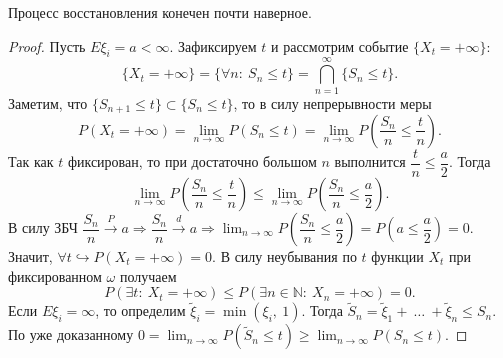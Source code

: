 \begin{example}
\begin{tikzpicture}[x=0.75pt,y=0.75pt,yscale=-1,xscale=1]
\end{tikzpicture}

\end{example}
\begin{proposition}
Процесс восстановления конечен почти наверное.
\end{proposition}
\begin{proof}
Пусть $\displaystyle E\xi _{i} =a< \infty $. Зафиксируем $\displaystyle t$ и рассмотрим событие $\displaystyle \{X_{t} =+\infty \}$:
\begin{equation*}
\{X_{t} =+\infty \} =\{\forall n:\ S_{n} \leqslant t\} =\bigcap _{n=1}^{\infty }\{S_{n} \leqslant t\} .
\end{equation*}
Заметим, что $\displaystyle \{S_{n+1} \leqslant t\} \subset \{S_{n} \leqslant t\}$, то в силу непрерывности меры
\begin{equation*}
P( X_{t} =+\infty ) =\lim _{n\rightarrow \infty } P( S_{n} \leqslant t) =\lim _{n\rightarrow \infty } P\left(\dfrac{S_{n}}{n} \leqslant \dfrac{t}{n}\right) .
\end{equation*}
Так как $\displaystyle t$ фиксирован, то при достаточно большом $\displaystyle n$ выполнится $\displaystyle \dfrac{t}{n} \leqslant \dfrac{a}{2}$. Тогда
\begin{equation*}
\lim _{n\rightarrow \infty } P\left(\dfrac{S_{n}}{n} \leqslant \dfrac{t}{n}\right) \leqslant \lim _{n\rightarrow \infty } P\left(\dfrac{S_{n}}{n} \leqslant \dfrac{a}{2}\right) .
\end{equation*}
В силу ЗБЧ $\displaystyle \dfrac{S_{n}}{n}\xrightarrow{P} a\Rightarrow \dfrac{S_{n}}{n}\xrightarrow{d} a\Rightarrow \lim _{n\rightarrow \infty } P\left(\dfrac{S_{n}}{n} \leqslant \dfrac{a}{2}\right) =P\left( a\leqslant \dfrac{a}{2}\right) =0$. Значит, $\displaystyle \forall t\hookrightarrow P( X_{t} =+\infty ) =0$. В силу неубывания по $\displaystyle t$ функции $\displaystyle X_{t}$ при фиксированном $\displaystyle \omega $ получаем
\begin{equation*}
P( \exists t:\ X_{t} =+\infty ) \leqslant P( \exists n\in \mathbb{N} :\ X_{n} =+\infty ) =0.
\end{equation*}
Если $\displaystyle E\xi _{i} =\infty $, то определим $\displaystyle \tilde{\xi }_{i} =\min( \xi _{i} ,\ 1)$. Тогда $\displaystyle \tilde{S}_{n} =\tilde{\xi }_{1} +\ \dotsc \ +\tilde{\xi }_{n} \leqslant S_{n}$. По уже доказанному $\displaystyle 0=\lim _{n\rightarrow \infty } P\left(\tilde{S}_{n} \leqslant t\right) \geqslant \lim _{n\rightarrow \infty } P( S_{n} \leqslant t)$.
\end{proof}
